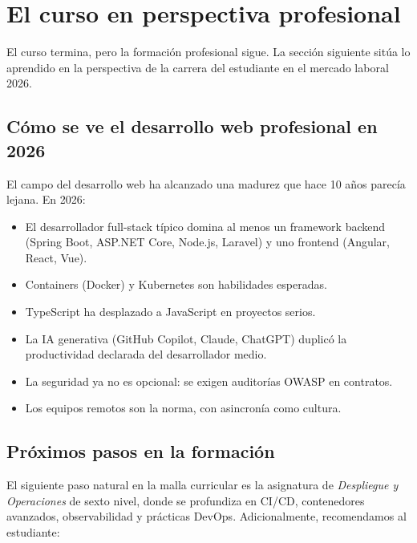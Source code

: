 \section{El curso en perspectiva profesional}

El curso termina, pero la formación profesional sigue. La
sección siguiente sitúa lo aprendido en la perspectiva de la
carrera del estudiante en el mercado laboral 2026.


\subsection{Cómo se ve el desarrollo web profesional en 2026}

El campo del desarrollo web ha alcanzado una madurez que hace 10
años parecía lejana. En 2026:

\begin{itemize}
\item El desarrollador full-stack típico domina al menos un framework
backend (Spring Boot, ASP.NET Core, Node.js, Laravel) y uno frontend
(Angular, React, Vue).
\item Containers (Docker) y Kubernetes son habilidades esperadas.
\item TypeScript ha desplazado a JavaScript en proyectos serios.
\item La IA generativa (GitHub Copilot, Claude, ChatGPT) duplicó la
productividad declarada del desarrollador medio.
\item La seguridad ya no es opcional: se exigen auditorías OWASP en
contratos.
\item Los equipos remotos son la norma, con asincronía como cultura.
\end{itemize}

\subsection{Próximos pasos en la formación}

El siguiente paso natural en la malla curricular es la asignatura de
\emph{Despliegue y Operaciones} de sexto nivel, donde se profundiza
en CI/CD, contenedores avanzados, observabilidad y prácticas DevOps.
Adicionalmente, recomendamos al estudiante:

